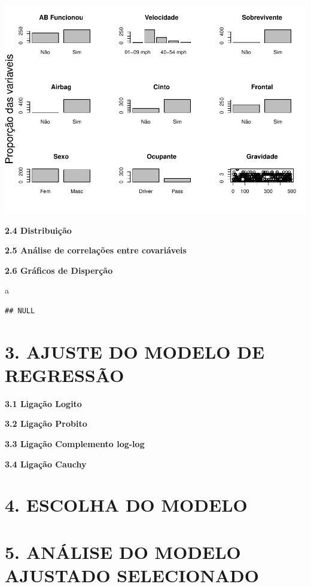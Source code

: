 \documentclass[]{article}
\newenvironment{Shaded}{\begin{snugshade}}{\end{snugshade}}
\newcommand{\NormalTok}[1]{{#1}}
\begin{document}
\includegraphics{Dados_Binários1_files/figure-latex/unnamed-chunk-5-2.pdf}

\textbf{2.4 Distribuição}

\textbf{2.5 Análise de correlações entre covariáveis}

\textbf{2.6 Gráficos de Disperção}

\begin{Shaded}
\begin{Highlighting}[]
\NormalTok{a}
\end{Highlighting}
\end{Shaded}

\begin{verbatim}
## NULL
\end{verbatim}

\section{3. AJUSTE DO MODELO DE
REGRESSÃO}\label{ajuste-do-modelo-de-regressao}

\textbf{3.1 Ligação Logito}

\textbf{3.2 Ligação Probito}

\textbf{3.3 Ligação Complemento log-log}

\textbf{3.4 Ligação Cauchy}

\section{4. ESCOLHA DO MODELO}\label{escolha-do-modelo}

\section{5. ANÁLISE DO MODELO AJUSTADO
SELECIONADO}\label{analise-do-modelo-ajustado-selecionado}
\end{document}

